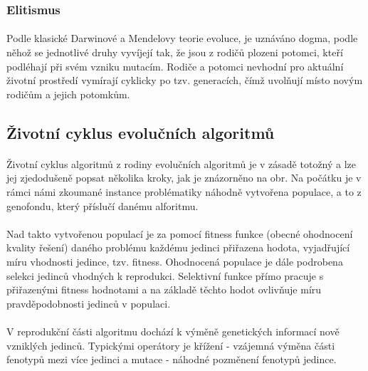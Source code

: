 \documentclass[bc,male,java,dept460]{diploma}		%
\begin{document}
\subsubsection{Elitismus}
\paragraph*{}
Podle klasické Darwinové a Mendelovy teorie evoluce, je uznáváno dogma, podle něhož se jednotlivé druhy vyvíjejí tak, že jsou z rodičů
plozeni potomci, kteří podléhají při svém vzniku mutacím. Rodiče a potomci nevhodní pro aktuální životní prostředí vymírají cyklicky po tzv. generacích, čímž uvolňují místo novým rodičům a jejich potomkům.

\subsection{Životní cyklus evolučních algoritmů}

\paragraph*{}
Životní cyklus algoritmů z rodiny evolučních algoritmů je v zásadě totožný a lze jej zjedodušeně popsat několika kroky, jak je znázorněno na obr. Na počátku je v rámci námi zkoumané instance problématiky náhodně vytvořena populace, a to z genofondu, který příslučí danému alforitmu.

\paragraph*{}
Nad takto vytvořenou populací je za pomocí fitness funkce (obecné ohodnocení kvality řešení) daného problému každému jedinci přiřazena hodota, vyjadřující míru vhodnosti jedince, tzv. fitness. Ohodnocená populace je dále podrobena selekci jedinců vhodných k reprodukci. Selektivní funkce přímo pracuje s přiřazenými fitness hodnotami a na základě těchto hodot ovlivňuje míru pravděpodobnosti jedinců v populaci.

\paragraph*{}
V reprodukční části algoritmu dochází k výměně genetických informací nově vzniklých jedinců. Typickými operátory je křížení - vzájemná výměna části fenotypů mezi více jedinci a mutace - náhodné pozměnení fenotypů jedince.
\end{document}
